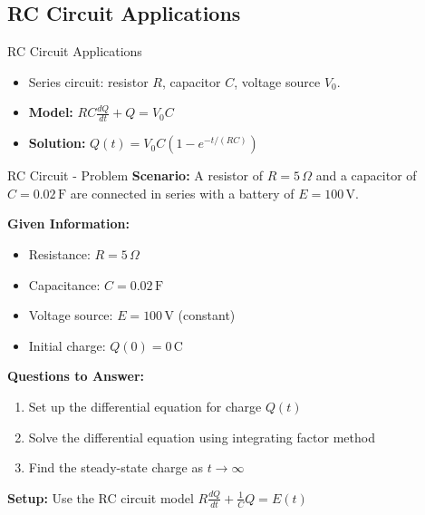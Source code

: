 \documentclass[10pt,aspectratio=169]{beamer}
\begin{document}
\subsection{RC Circuit Applications}
\begin{frame}{RC Circuit Applications}
    \begin{itemize}
        \item Series circuit: resistor $R$, capacitor $C$, voltage source $V_0$.
        \item \textbf{Model:} $RC\frac{dQ}{dt} + Q = V_0C$
        \item \textbf{Solution:} $Q(t) = V_0C(1 - e^{-t/(RC)})$
    \end{itemize}
\end{frame}

\begin{frame}{RC Circuit - Problem}
    \textbf{Scenario:} A resistor of $R=5\,\Omega$ and a capacitor of $C=0.02\,\mathrm{F}$ are connected in series with a battery of $E=100\,\mathrm{V}$.
    
    \textbf{Given Information:}
    \begin{itemize}
        \item Resistance: $R = 5\,\Omega$
        \item Capacitance: $C = 0.02\,\mathrm{F}$
        \item Voltage source: $E = 100\,\mathrm{V}$ (constant)
        \item Initial charge: $Q(0) = 0\,\mathrm{C}$
    \end{itemize}
    
    \textbf{Questions to Answer:}
    \begin{enumerate}
        \item Set up the differential equation for charge $Q(t)$
        \item Solve the differential equation using integrating factor method
        \item Find the steady-state charge as $t \to \infty$
    \end{enumerate}
    
    \textbf{Setup:} Use the RC circuit model $R\frac{dQ}{dt} + \frac{1}{C}Q = E(t)$
\end{frame}
\end{document}
